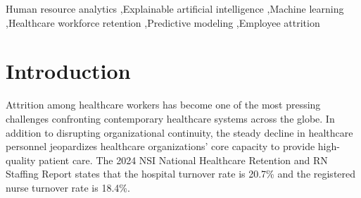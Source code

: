 \documentclass[a4paper,fleqn]{cas-sc}
\begin{document}

\begin{keywords}
Human resource analytics \sep Explainable artificial intelligence \sep Machine learning \sep Healthcare workforce retention \sep Predictive modeling \sep Employee attrition
\end{keywords}

\maketitle

\section{Introduction}
\label{sec:intr}
Attrition among healthcare workers has become one of the most pressing challenges confronting contemporary healthcare systems across the globe. In addition to disrupting organizational continuity, the steady decline in healthcare personnel jeopardizes healthcare organizations' core capacity to provide high-quality patient care. The 2024 NSI National Healthcare Retention and RN Staffing Report \cite{NSI2024} states that the hospital turnover rate is 20.7\% and the registered nurse turnover rate is 18.4\%.
\end{document}
